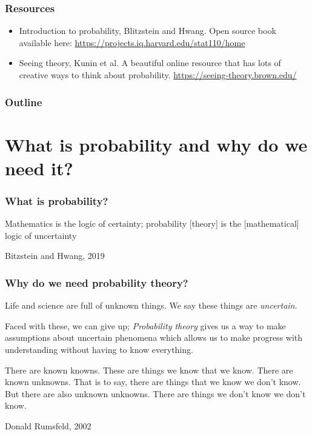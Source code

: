 \documentclass{beamer}
\begin{document}
	\begin{frame}
		\frametitle{Resources}
		
		\begin{itemize}
			\item Introduction to probability, Blitzstein and Hwang. Open source book available here: \url{https://projects.iq.harvard.edu/stat110/home}
			\item Seeing theory, Kunin et al. A beautiful online resource that has lots of creative ways to think about probability. \url{https://seeing-theory.brown.edu/}
		\end{itemize}
		
	\end{frame}

	\begin{frame}
		\frametitle{Outline}
		\tableofcontents
	\end{frame}

	\section{What is probability and why do we need it?}
	\frame{\tableofcontents[currentsection]}
	
	\begin{frame}
		\frametitle{What is probability?}
		\epigraph{Mathematics is the logic of certainty; probability [theory] is the [mathematical] logic of uncertainty}{Bitzstein and Hwang, 2019}
		
	\end{frame}

	\begin{frame}
		\frametitle{Why do we need probability theory?}
		
		Life and science are full of unknown things. We say these things are \textit{uncertain}.
		
		Faced with these, we can give up; \textit{Probability theory} gives us a way to make assumptions about uncertain phenomena which allows us to make progress with understanding without having to know everything.
		
		\epigraph{There are known knowns. These are things we know that we know. There are known unknowns. That is to say, there are things that we know we don't know. But there are also unknown unknowns. There are things we don't know we don't know.}{Donald Rumsfeld, 2002}
		
	\end{frame}
	
\end{document}
